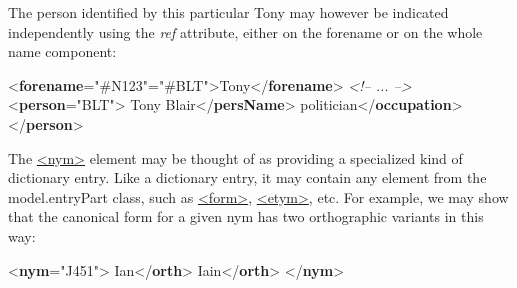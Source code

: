 The person identified by this particular Tony may however be indicated independently using the {\itshape ref} attribute, either on the forename or on the whole name component: \par\bgroup{}\exampleFont \begin{shaded}\noindent\mbox{}{<\textbf{forename}\hspace*{1em}{nymRef}="{\#N123}"\hspace*{1em}{ref}="{\#BLT}">}Tony{</\textbf{forename}>}\mbox{}\newline 
\textit{<!-- ... -->}\mbox{}\newline 
{<\textbf{person}\hspace*{1em}{xml:id}="{BLT}">}\mbox{}\newline 
{}Tony Blair{</\textbf{persName}>}\mbox{}\newline 
{}politician{</\textbf{occupation}>}\mbox{}\newline 
{</\textbf{person}>}\end{shaded}\egroup\par \par
The \hyperref[TEI.nym]{<nym>} element may be thought of as providing a specialized kind of dictionary entry. Like a dictionary entry, it may contain any element from the \textsf{model.entryPart} class, such as \hyperref[TEI.form]{<form>}, \hyperref[TEI.etym]{<etym>}, etc. For example, we may show that the canonical form for a given nym has two orthographic variants in this way: \par\bgroup{}\exampleFont \begin{shaded}\noindent\mbox{}{<\textbf{nym}\hspace*{1em}{xml:id}="{J451}">}\mbox{}\newline 
{}\mbox{}\newline 
\hspace*{1em}Ian{</\textbf{orth}>}\mbox{}\newline 
\hspace*{1em}Iain{</\textbf{orth}>}\mbox{}\newline 
{}\mbox{}\newline 
{</\textbf{nym}>}\end{shaded}\egroup\par \par
